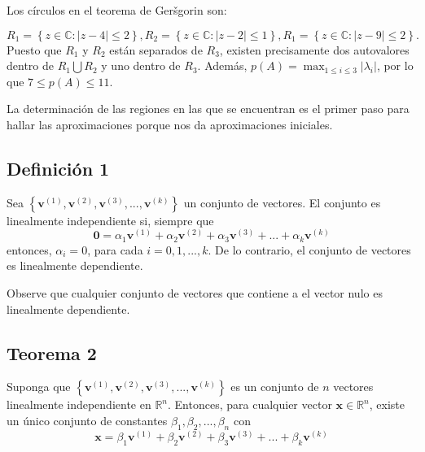 \documentclass[12pt, a4paper]{article}
\numberwithin{subsection}{section} %
\begin{document}
        Los círculos en el teorema de Geršgorin son:

        \begin{equation*}
        R_{1} = \left\{ z \in \mathbb{C} : \left| z - 4 \right| \le 2 \right\}, R_{2} = \left\{ z \in \mathbb{C} : \left| z - 2 \right| \le 1 \right\}, R_{1} = \left\{ z \in \mathbb{C} : \left| z - 9 \right| \le 2 \right\}.
        \end{equation*}
        Puesto que $R_{1}$ y $R_{2}$ están separados de $R_{3}$, existen precisamente dos autovalores dentro de $R_{1}\bigcup R_{2}$ y uno dentro de $R_{3}$. Además, $p(A)= \max_{1\le i\le 3} \left| \lambda_{i} \right|$, por lo que $7 \le p(A) \le 11$.
        
        La determinación de las regiones en las que se encuentran es el primer paso para hallar las aproximaciones porque nos da aproximaciones iniciales.
        
        \subsection{\textnormal{Definición 1}}
        
        Sea $\left\{ \textbf{v}^{\left( 1 \right)}, \textbf{v}^{\left( 2 \right)}, \textbf{v}^{\left( 3 \right)}, ..., \textbf{v}^{\left( k \right)} \right\}$ un conjunto de vectores. El conjunto es linealmente independiente si, siempre que
        \begin{equation}
        \textbf{0} = \alpha_{1}\textbf{v}^{\left( 1 \right)} + \alpha_{2}\textbf{v}^{\left( 2 \right)} + \alpha_{3}\textbf{v}^{\left( 3 \right)} + ... + \alpha_{k}\textbf{v}^{\left( k \right)}
        \end{equation}
        entonces, $\alpha_{i}=0$, para cada $i = 0, 1, ..., k$. De lo contrario, el conjunto de vectores es linealmente dependiente.
        
        Observe que cualquier conjunto de vectores que contiene a el vector nulo es linealmente dependiente.
        
        \subsection{\textnormal{Teorema 2}}
        
        Suponga que $\left\{ \textbf{v}^{\left( 1 \right)}, \textbf{v}^{\left( 2 \right)}, \textbf{v}^{\left( 3 \right)}, ..., \textbf{v}^{\left( k \right)} \right\}$ es un conjunto de $n$ vectores linealmente independiente en $\mathbb{R}^{n}$. Entonces, para cualquier vector $\textbf{x} \in \mathbb{R}^{n}$, existe un único conjunto de constantes $\beta_{1}, \beta_{2}, ..., \beta_{n}$ con
        \begin{equation}
        \textbf{x} = \beta_{1}\textbf{v}^{\left( 1 \right)} + \beta_{2}\textbf{v}^{\left( 2 \right)} + \beta_{3}\textbf{v}^{\left( 3 \right)} + ... + \beta_{k}\textbf{v}^{\left( k \right)}
        \end{equation}
        
\end{document}
